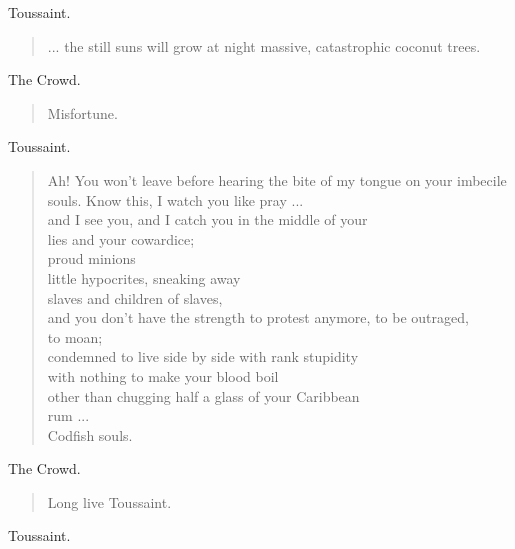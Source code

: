 \documentclass[letterpaper,article,12pt,oneside,notitlepage]{memoir}
\begin{document}
\begin{center}Toussaint.\end{center}

\begin{verse}
... the still suns will grow at night massive, catastrophic coconut trees. \\
\end{verse}

\begin{center}The Crowd.\end{center}

\begin{verse}
Misfortune. \\
\end{verse}

\begin{center}Toussaint.\end{center}

\begin{verse}
\indent Ah! You won't leave before hearing the bite of my tongue on your imbecile souls.
Know this, I watch you like pray ... \\
and I see you, and I catch you in the middle of your \\
lies and your cowardice; \\
proud minions \\
little hypocrites, sneaking away \\
slaves and children of slaves, \\
and you don't have the strength to protest anymore, to be outraged, \\
to moan; \\
condemned to live side by side with rank stupidity \\
with nothing to make your blood boil \\
other than chugging half a glass of your Caribbean \\
rum ... \\
Codfish souls. \\
\end{verse}


\begin{center}The Crowd.\end{center}

\begin{verse}
\hspace{1cm} Long live Toussaint. \\
\end{verse}

\begin{center}Toussaint.\end{center}
\end{document}
